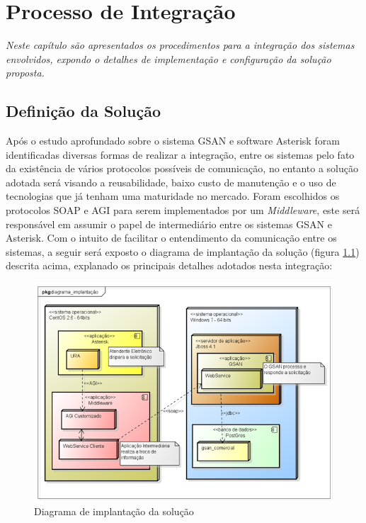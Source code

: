 \chapter[Processo de Integração]{\textbf{P}rocesso de \textbf{I}ntegração}

\textit{Neste capítulo são apresentados os procedimentos para a integração dos sistemas envolvidos, expondo o detalhes de implementação e configuração da solução proposta.}


\section{Definição da Solução}

Após o estudo aprofundado sobre o sistema GSAN e software Asterisk foram identificadas diversas formas de realizar a integração, entre os sistemas pelo fato da existência de vários protocolos possíveis de comunicação, no entanto a solução adotada será visando a reusabilidade, baixo custo de manutenção e o uso de tecnologias que já tenham uma maturidade no mercado. Foram escolhidos os protocolos SOAP e AGI para serem implementados por um \textit{Middleware}, este será responsável em assumir o papel de intermediário entre os sistemas GSAN e Asterisk. Com o intuito de facilitar o entendimento da comunicação entre os sistemas, a seguir será exposto o diagrama de implantação da solução (figura \ref{figura:diagramaImplantacao}) descrita acima, explanado os principais detalhes adotados nesta integração:


\begin{figure}[H]
	\centering
	\caption{Diagrama de implantação da solução}
	\label{figura:diagramaImplantacao}
	\includegraphics{figuras/diagrama_implantacao.png}
\end{figure}


